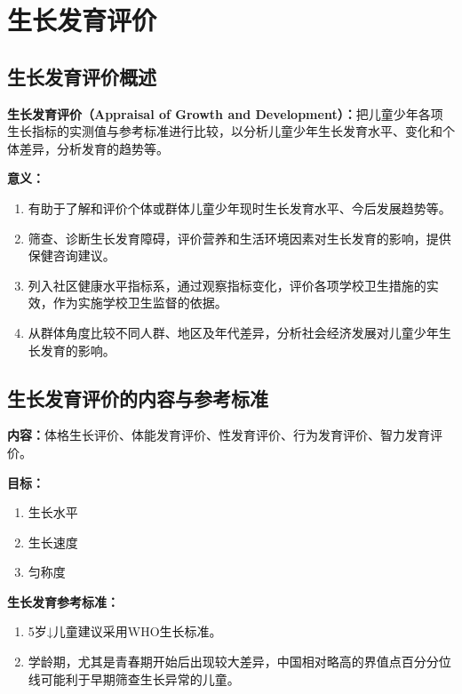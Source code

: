 \section{生长发育评价}

\subsection{生长发育评价概述}

\begin{keybox}
\textbf{生长发育评价（Appraisal of Growth and Development）：}把儿童少年各项生长指标的实测值与参考标准进行比较，以分析儿童少年生长发育水平、变化和个体差异，分析发育的趋势等。

\textbf{意义：}
\begin{enumerate}[leftmargin=*]
    \item 有助于了解和评价个体或群体儿童少年现时生长发育水平、今后发展趋势等。
    \item 筛查、诊断生长发育障碍，评价营养和生活环境因素对生长发育的影响，提供保健咨询建议。
    \item 列入社区健康水平指标系，通过观察指标变化，评价各项学校卫生措施的实效，作为实施学校卫生监督的依据。
    \item 从群体角度比较不同人群、地区及年代差异，分析社会经济发展对儿童少年生长发育的影响。
\end{enumerate}
\end{keybox}

\subsection{生长发育评价的内容与参考标准}

\begin{defbox}
\textbf{内容：}体格生长评价、体能发育评价、性发育评价、行为发育评价、智力发育评价。

\textbf{目标：}
\begin{enumerate}[leftmargin=*]
    \item 生长水平
    \item 生长速度
    \item 匀称度
\end{enumerate}

\textbf{生长发育参考标准：}
\begin{enumerate}[leftmargin=*]
    \item 5岁↓儿童建议采用WHO生长标准。
    \item 学龄期，尤其是青春期开始后出现较大差异，中国相对略高的界值点百分分位线可能利于早期筛查生长异常的儿童。
\end{enumerate}
\end{defbox}

